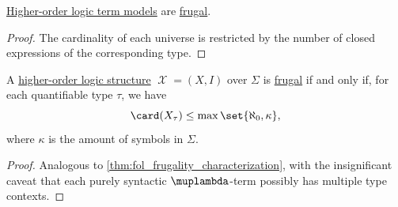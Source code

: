 \begin{proposition}\label{thm:hol_term_model_is_frugal}
  \hyperref[def:hol_term_model]{Higher-order logic term models} are \hyperref[def:hol_frugal_structure]{frugal}.
\end{proposition}
\begin{proof}
  The cardinality of each universe is restricted by the number of closed expressions of the corresponding type.
\end{proof}

\begin{proposition}\label{thm:hol_frugality_characterization}
  A \hyperref[def:hol_structure]{higher-order logic structure} \( \mscrX = (X, I) \) over \( \Sigma \) is \hyperref[def:hol_frugal_structure]{frugal} if and only if, for each quantifiable type \( \tau \), we have
  \begin{equation*}
    \card(X_\tau) \leq \max\set{ \aleph_0, \kappa },
  \end{equation*}
  where \( \kappa \) is the amount of symbols in \( \Sigma \).
\end{proposition}
\begin{proof}
  Analogous to \cref{thm:fol_frugality_characterization}, with the insignificant caveat that each purely syntactic \( \muplambda \)-term possibly has multiple type contexts.
\end{proof}

